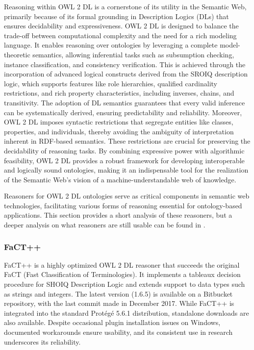 Reasoning within OWL 2 DL is a cornerstone of its utility in the Semantic Web, primarily because of its formal grounding in Description Logics (DLs) that ensures decidability and expressiveness. OWL 2 DL is designed to balance the trade-off between computational complexity and the need for a rich modeling language. It enables reasoning over ontologies by leveraging a complete model-theoretic semantics, allowing inferential tasks such as subsumption checking, instance classification, and consistency verification. This is achieved through the incorporation of advanced logical constructs derived from the SROIQ description logic, which supports features like role hierarchies, qualified cardinality restrictions, and rich property characteristics, including inverses, chains, and transitivity. The adoption of DL semantics guarantees that every valid inference can be systematically derived, ensuring predictability and reliability. Moreover, OWL 2 DL imposes syntactic restrictions that segregate entities like classes, properties, and individuals, thereby avoiding the ambiguity of interpretation inherent in RDF-based semantics. These restrictions are crucial for preserving the decidability of reasoning tasks. By combining expressive power with algorithmic feasibility, OWL 2 DL provides a robust framework for developing interoperable and logically sound ontologies, making it an indispensable tool for the realization of the Semantic Web's vision of a machine-understandable web of knowledge.

Reasoners for OWL 2 DL ontologies serve as critical components in semantic web technologies, facilitating various forms of reasoning essential for ontology-based applications. This section provides a short analysis of these reasoners, but a deeper analysis on what reasoners are still usable can be found in \cite{abichtOWLReasonersStill2023}. 

\subsubsection{FaCT++}
FaCT++\cite{tsarkovFaCTDescriptionLogic2006} is a highly optimized OWL 2 DL reasoner that succeeds the original FaCT (Fast Classification of Terminologies). It implements a tableaux decision procedure for SHOIQ Description Logic and extends support to data types such as strings and integers. The latest version (1.6.5) is available on a Bitbucket repository, with the last commit made in December 2017. While FaCT++ is integrated into the standard Protégé 5.6.1 distribution, standalone downloads are also available. Despite occasional plugin installation issues on Windows, documented workarounds ensure usability, and its consistent use in research underscores its reliability.

